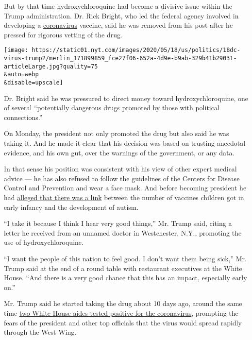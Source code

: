 But by that time hydroxychloroquine had become a divisive issue within
the Trump administration. Dr. Rick Bright, who led the federal agency
involved in developing a
\href{https://www.nytimes.com/2020/04/30/health/coronavirus-antiviral-drugs.html}{coronavirus}
vaccine, said he was removed from his post after he pressed for rigorous
vetting of the drug.

\texttt{[image: https://static01.nyt.com/images/2020/05/18/us/politics/18dc-virus-trump2/merlin\_171899859\_fce27f06-652a-4d9e-b9ab-329b41b29031-articleLarge.jpg?quality=75\\\&auto=webp\\\&disable=upscale]}

Dr. Bright said he was pressured to direct money toward
hydroxychloroquine, one of several ``potentially dangerous drugs
promoted by those with political connections.''

On Monday, the president not only promoted the drug but also said he was
taking it. And he made it clear that his decision was based on trusting
anecdotal evidence, and his own gut, over the warnings of the
government, or any data.

In that sense his position was consistent with his view of other expert
medical advice --- he has also refused to follow the guidelines of the
Centers for Disease Control and Prevention and wear a face mask. And
before becoming president he had
\href{https://www.statnews.com/2019/04/26/trump-vaccinations-measles/}{alleged
that there was a link} between the number of vaccines children got in
early infancy and the development of autism.

``I take it because I think I hear very good things,'' Mr. Trump said,
citing a letter he received from an unnamed doctor in Westchester, N.Y.,
promoting the use of hydroxychloroquine.

``I want the people of this nation to feel good. I don't want them being
sick,'' Mr. Trump said at the end of a round table with restaurant
executives at the White House. ``And there is a very good chance that
this has an impact, especially early on.''

Mr. Trump said he started taking the drug about 10 days ago, around the
same time
\href{https://www.nytimes.com/2020/05/10/us/politics/white-house-coronavirus-trump.html}{two
White House aides tested positive for the coronavirus}, prompting the
fears of the president and other top officials that the virus would
spread rapidly through the West Wing.

\href{https://www.nytimes.com/news-event/coronavirus?action=click\&pgtype=Article\&state=default\&region=MAIN_CONTENT_3\&context=storylines_faq}{}

